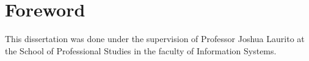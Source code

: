 
\chapter*{Foreword}

This dissertation was done under the supervision of Professor Joshua Laurito at the School of Professional Studies in the faculty of Information Systems.
\\\\
\\\\
\\\\


\vfill

%
